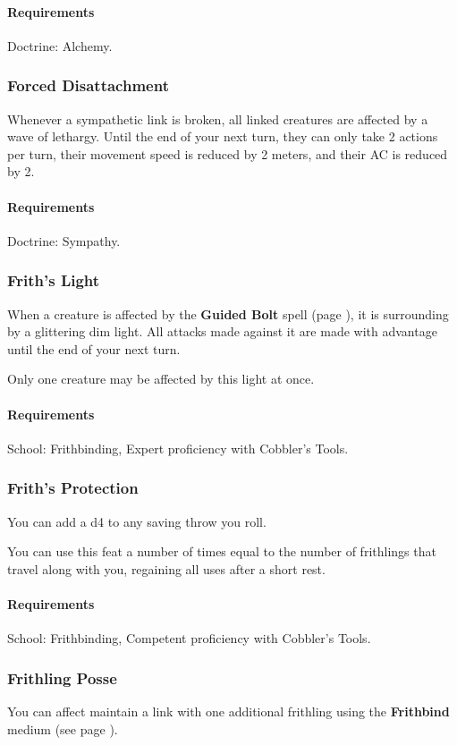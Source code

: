     \paragraph{Requirements} Doctrine: Alchemy.
\subsubsection{Forced Disattachment} \label{feat::forceddisattachment}
    Whenever a sympathetic link is broken, all linked creatures are affected by a wave of lethargy.
    Until the end of your next turn, they can only take 2 actions per turn, their movement speed is reduced by 2 meters, and their AC is reduced by 2.
    \paragraph{Requirements} Doctrine: Sympathy.
\subsubsection{Frith's Light} \label{feat::frithslight}
    When a creature is affected by the \textbf{Guided Bolt} spell (page \pageref{spell::guidedstrike}), it is surrounding by a glittering dim light.
    All attacks made against it are made with advantage until the end of your next turn.

    Only one creature may be affected by this light at once.
    \paragraph{Requirements} School: Frithbinding, Expert proficiency with Cobbler's Tools.
\subsubsection{Frith's Protection} \label{feat::frithsprotection}
    You can add a d4 to any saving throw you roll.

    You can use this feat a number of times equal to the number of frithlings that travel along with you, regaining all uses after a short rest.
    \paragraph{Requirements} School: Frithbinding, Competent proficiency with Cobbler's Tools.
\subsubsection{Frithling Posse} \label{feat::frithlingposse}
    You can affect maintain a link with one additional frithling using the \textbf{Frithbind} medium (see page \pageref{medium::frithbind}).

